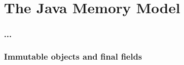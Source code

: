 \documentclass[aspectratio=169]{beamer}
\begin{document}
\section{The Java Memory Model}

\begin{frame}\frametitle{...}
\end{frame}


\begin{frame}\frametitle{Immutable objects and final fields}
\end{frame}


\end{document}
